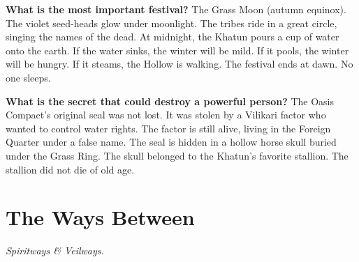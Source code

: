 \begin{almanac}
\textbf{What is the most important festival?} The Grass Moon (autumn equinox). The violet seed-heads glow under moonlight. The tribes ride in a great circle, singing the names of the dead. At midnight, the Khatun pours a cup of water onto the earth. If the water sinks, the winter will be mild. If it pools, the winter will be hungry. If it steams, the Hollow is walking. The festival ends at dawn. No one sleeps.

\textbf{What is the secret that could destroy a powerful person?} The Oasis Compact's original seal was not lost. It was stolen by a Vilikari factor who wanted to control water rights. The factor is still alive, living in the Foreign Quarter under a false name. The seal is hidden in a hollow horse skull buried under the Grass Ring. The skull belonged to the Khatun's favorite stallion. The stallion did not die of old age.
\end{almanac}

\newpage

\newpage

\chapter{The Ways Between}
\emph{Spiritways \& Veilways.}

